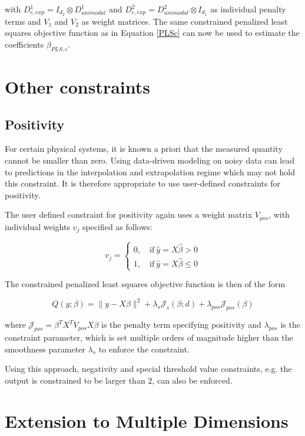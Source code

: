 with $D_{c,exp}^1 = I_{d_2} \otimes D_{unimodal}^1$ and $D_{c,exp}^2 = D_{unimodal}^2 \otimes I_{d_1}$ as individual penalty terms and $V_1$ and $V_2$ as weight matrices. The same constrained penalized least squares objective function as in Equation \ref{PLSc} can now be used to estimate the coefficients $\beta_{PLS,c}$. \cite{fahrmeir2013regression}

\section{Other constraints}

\subsection{Positivity}

For certain physical systems, it is known a priori that the measured quantity cannot be smaller than zero. Using data-driven modeling on noisy data can lead to predictions in the interpolation and extrapolation regime which may not hold this constraint. It is therefore appropriate to use user-defined constraints for positivity.

The user defined constraint for positivity again uses a weight matrix $V_{pos}$, with individual weights $v_j$ specified as follows:

$$v_j = \begin{cases} 0, \quad \text{if} \ \hat y = X\hat \beta > 0\\ 1, \quad \text{if} \ \hat y = X \hat \beta \le 0 \end{cases}$$

The constrained penalized least squares objective function is then of the form

$$Q(y; \beta) = \lVert y - X\beta \rVert^2 + \lambda_s \mathcal J_s(\beta; d) + \lambda_{pos} \mathcal J_{pos}(\beta) $$

where $\mathcal J_{pos} = \beta^T X^T V_{pos} X \beta$ is the penalty term specifying positivity and $\lambda_{pos}$ is the constraint parameter, which is set multiple orders of magnitude higher than the smoothness parameter $\lambda_s$ to enforce the constraint.

Using this approach, negativity and special threshold value constraints, e.g. the output is constrained to be larger than $2$, can also be enforced.

\section{Extension to Multiple Dimensions}

